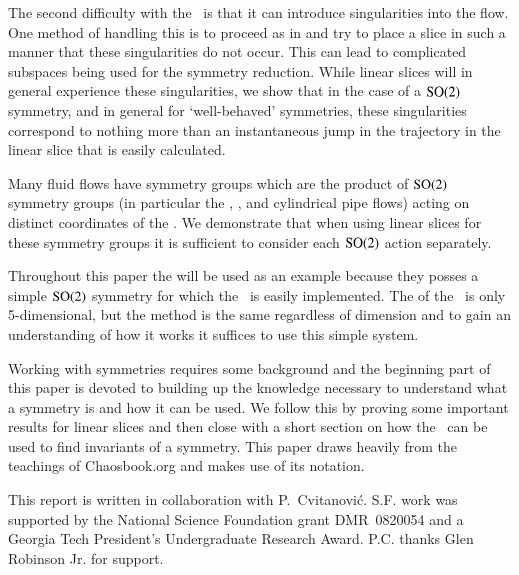 The second difficulty with the \mslices\ is that it can introduce singularities into the flow. One method of handling this is to proceed as in  and try to place a slice in such a manner that these singularities do not occur. This can lead to complicated subspaces being used for the symmetry reduction. While linear slices will in general experience these singularities, we show that in the case of a $\textrm{SO}(2)$ symmetry, and in general for `well-behaved' symmetries, these singularities correspond to nothing more than an instantaneous jump in the trajectory in the linear slice that is easily calculated.

Many fluid flows have symmetry groups which are the product of $\textrm{SO}(2)$ symmetry groups (in particular the \KS, {\pCf}, and cylindrical pipe flows) acting on distinct coordinates of the {\statesp}. We demonstrate that when using linear slices for these symmetry groups it is sufficient to consider each $\textrm{SO}(2)$ action separately.

Throughout this paper the \cLe{} will be used as an example because they posses a simple $\textrm{SO}(2)$ symmetry for which the \mslices\ is easily implemented. The {\statesp} of the \cLe\ is only 5-dimensional, but the method is the same regardless of dimension and to gain an understanding of how it works it suffices to use this simple system.

Working with symmetries requires some background and the beginning part of this paper is devoted to building up the knowledge necessary to understand what a symmetry is and how it can be used. We follow this by proving some important results for linear slices and then close with a short section on how the \mslices\ can be used to find invariants of a symmetry. This paper draws heavily from the teachings of Chaosbook.org and makes use of its notation.

\bigskip
{}
This report is written in collaboration with
P.~Cvitanovi\'c.
S.F. work was supported by the National Science Foundation
grant DMR~0820054 and a Georgia Tech President's Undergraduate
Research Award.
P.C. thanks Glen Robinson Jr. for support. 	



